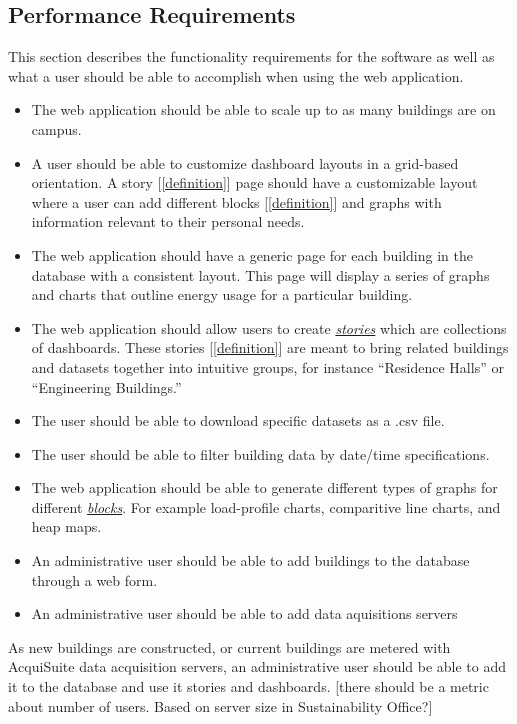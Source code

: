 \documentclass[onecolumn, draftclsnofoot,10pt, compsoc]{IEEEtran}
\begin{document}
    \subsection{Performance Requirements}
    This section describes the functionality requirements for the software as well as what a user should be able to accomplish when using the web application.
    \begin{itemize}
        \item The web application should be able to scale up to as many buildings are on campus.
        \item A user should be able to customize dashboard layouts in a grid-based orientation. A story [\ref{definition}] page should have a customizable layout where a user can add different blocks [\ref{definition}] and graphs with information relevant to their personal needs.
        \item The web application should have a generic page for each building in the database with a consistent layout. This page will display a series of graphs and charts that outline energy usage for a particular building.
        \item The web application should allow users to create \hyperref[definition]{\textit{stories}} which are collections of dashboards. These stories [\ref{definition}] are meant to bring related buildings and datasets together into intuitive groups, for instance ``Residence Halls'' or ``Engineering Buildings.''
        \item The user should be able to download specific datasets as a .csv file.
        \item The user should be able to filter building data by date/time specifications.
        \item The web application should be able to generate different types of graphs for different \hyperref[definition]{\textit{blocks}}. For example load-profile charts, comparitive line charts, and heap maps.
        \item An administrative user should be able to add buildings to the database through a web form.
        \item An administrative user should be able to add data aquisitions servers
    \end{itemize}

     As new buildings are constructed, or current buildings are metered with AcquiSuite data acquisition servers, an administrative user should be able to add it to the database and use it stories and dashboards.  
    [there should be a metric about number of users. Based on server size in Sustainability Office?]
    
\end{document}
